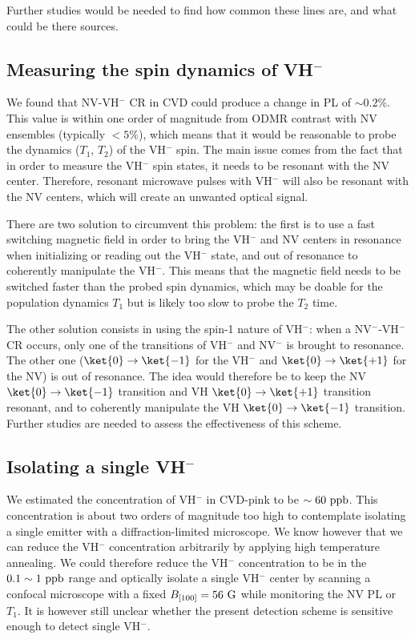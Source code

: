 \documentclass[a4paper,11pt]{report}
\begin{document}
Further studies would be needed to find how common these lines are, and what could be there sources.

\subsection{Measuring the spin dynamics of VH$^-$}

We found that NV-VH$^-$ CR in CVD could produce a change in PL of $\sim 0.2 \%$. This value is within one order of magnitude from ODMR contrast with NV ensembles (typically $<5 \%$), which means that it would be reasonable to probe the dynamics ($T_1$, $T_2$) of the VH$^-$ spin. The main issue comes from the fact that in order to measure the VH$^-$ spin states, it needs to be resonant with the NV center. Therefore, resonant microwave pulses with VH$^-$ will also be resonant with the NV centers, which will create an unwanted optical signal.

There are two solution to circumvent this problem: the first is to use a fast switching magnetic field in order to bring the VH$^-$ and NV centers in resonance when initializing or reading out the VH$^-$ state, and out of resonance to coherently manipulate the VH$^-$. This means that the magnetic field needs to be switched faster than the probed spin dynamics, which may be doable for the population dynamics $T_1$ but is likely too slow to probe the $T_2$ time.

The other solution consists in using the spin-1 nature of VH$^-$: when a NV$^-$-VH$^-$ CR occurs, only one of the transitions of VH$^-$ and NV$^-$ is brought to resonance. The other one ($\ket{0} \to \ket{-1}$ for the VH$^-$ and $\ket{0} \to \ket{+1}$ for the NV) is out of resonance. The idea would therefore be to keep the NV $\ket{0} \to \ket{-1}$ transition and VH $\ket{0} \to \ket{+1}$ transition resonant, and to coherently manipulate the VH $\ket{0} \to \ket{-1}$ transition. Further studies are needed to assess the effectiveness of this scheme.

\subsection{Isolating a single VH$^-$}

We estimated the concentration of VH$^-$ in CVD-pink to be $\sim 60\ \rm ppb$. This concentration is about two orders of magnitude too high to contemplate isolating a single emitter with a diffraction-limited microscope. We know however that we can reduce the VH$^-$ concentration arbitrarily by applying high temperature annealing. We could therefore reduce the VH$^-$ concentration to be in the $0.1 \sim 1\ \rm ppb$ range and optically isolate a single VH$^-$ center by scanning a confocal microscope with a fixed $B_{[100]}=56\ \rm G$ while monitoring the NV PL or $T_1$. It is however still unclear whether the present detection scheme is sensitive enough to detect single VH$^-$.

\printbibliography
\end{document}
